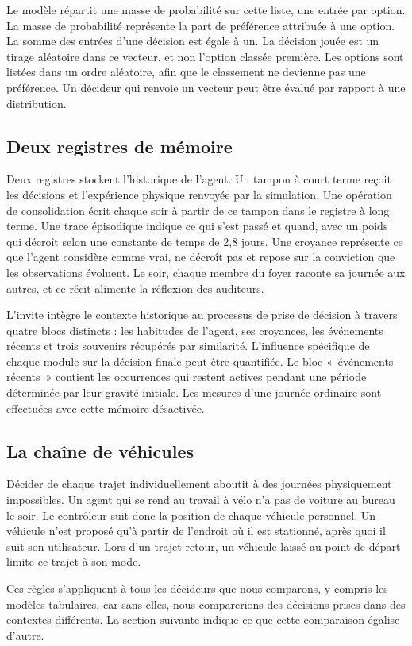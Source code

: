 Le modèle répartit une masse de probabilité sur cette liste, une entrée par option. La masse de probabilité représente la part de préférence attribuée à une option. La somme des entrées d’une décision est égale à un. La décision jouée est un tirage aléatoire dans ce vecteur, et non l’option classée première. Les options sont listées dans un ordre aléatoire, afin que le classement ne devienne pas une préférence. Un décideur qui renvoie un vecteur peut être évalué par rapport à une distribution.

\subsection{Deux registres de mémoire}
\label{sec:memory}

Deux registres stockent l'historique de l'agent. Un tampon à court terme reçoit les décisions et l'expérience physique renvoyée par la simulation. Une opération de consolidation écrit chaque soir à partir de ce tampon dans le registre à long terme. Une trace épisodique indique ce qui s'est passé et quand, avec un poids qui décroît selon une constante de temps de 2,8 jours. Une croyance représente ce que l'agent considère comme vrai, ne décroît pas et repose sur la conviction que les observations évoluent. Le soir, chaque membre du foyer raconte sa journée aux autres, et ce récit alimente la réflexion des auditeurs.

L'invite intègre le contexte historique au processus de prise de décision à travers quatre blocs distincts : les habitudes de l'agent, ses croyances, les événements récents et trois souvenirs récupérés par similarité. L'influence spécifique de chaque module sur la décision finale peut être quantifiée. Le bloc «~événements récents~» contient les occurrences qui restent actives pendant une période déterminée par leur gravité initiale. Les mesures d'une journée ordinaire sont effectuées avec cette mémoire désactivée.

\subsection{La chaîne de véhicules}
\label{sec:chain}

Décider de chaque trajet individuellement aboutit à des journées physiquement impossibles. Un agent qui se rend au travail à vélo n'a pas de voiture au bureau le soir. Le contrôleur suit donc la position de chaque véhicule personnel. Un véhicule n'est proposé qu'à partir de l'endroit où il est stationné, après quoi il suit son utilisateur. Lors d'un trajet retour, un véhicule laissé au point de départ limite ce trajet à son mode.

Ces règles s'appliquent à tous les décideurs que nous comparons, y compris les modèles tabulaires, car sans elles, nous comparerions des décisions prises dans des contextes différents. La section suivante indique ce que cette comparaison égalise d'autre.
